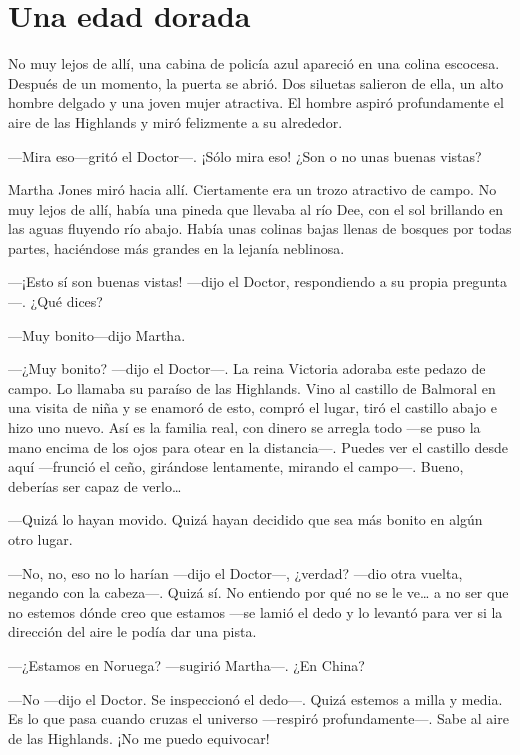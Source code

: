 \chapter*{Una edad dorada}

No muy lejos de allí, una cabina de policía azul apareció en una colina
escocesa. Después de un momento, la puerta se abrió. Dos siluetas
salieron de ella, un alto hombre delgado y una joven mujer atractiva. El
hombre aspiró profundamente el aire de las Highlands y miró felizmente a
su alrededor.

---Mira eso---gritó el Doctor---. ¡Sólo mira eso! ¿Son o no unas buenas
vistas?

Martha Jones miró hacia allí. Ciertamente era un trozo atractivo de
campo. No muy lejos de allí, había una pineda que llevaba al río Dee,
con el sol brillando en las aguas fluyendo río abajo. Había unas colinas
bajas llenas de bosques por todas partes, haciéndose más grandes en la
lejanía neblinosa.

---¡Esto sí son buenas vistas! ---dijo el Doctor, respondiendo a su
propia pregunta---. ¿Qué dices?

---Muy bonito---dijo Martha.

---¿Muy bonito? ---dijo el Doctor---. La reina Victoria adoraba este
pedazo de campo. Lo llamaba su paraíso de las Highlands. Vino al
castillo de Balmoral en una visita de niña y se enamoró de esto, compró
el lugar, tiró el castillo abajo e hizo uno nuevo. Así es la familia
real, con dinero se arregla todo ---se puso la mano encima de los ojos
para otear en la distancia---. Puedes ver el castillo desde aquí
---frunció el ceño, girándose lentamente, mirando el campo---. Bueno,
deberías ser capaz de verlo\ldots{}

---Quizá lo hayan movido. Quizá hayan decidido que sea más bonito en
algún otro lugar.

---No, no, eso no lo harían ---dijo el Doctor---, ¿verdad? ---dio otra
vuelta, negando con la cabeza---. Quizá sí. No entiendo por qué no se le
ve\ldots{} a no ser que no estemos dónde creo que estamos ---se lamió el
dedo y lo levantó para ver si la dirección del aire le podía dar una
pista.

---¿Estamos en Noruega? ---sugirió Martha---. ¿En China?

---No ---dijo el Doctor. Se inspeccionó el dedo---. Quizá estemos a
milla y media. Es lo que pasa cuando cruzas el universo ---respiró
profundamente---. Sabe al aire de las Highlands. ¡No me puedo
equivocar!

